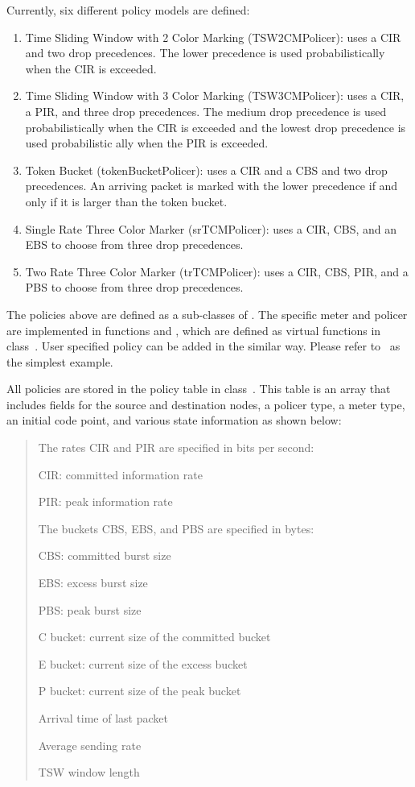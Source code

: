 Currently, six different policy models are defined:
\begin{enumerate}
\item
Time Sliding Window with 2 Color Marking (TSW2CMPolicer): 
  uses a CIR and two drop precedences.  
The lower precedence is used probabilistically when the CIR is exceeded.
\item
Time Sliding Window with 3 Color Marking (TSW3CMPolicer): 
  uses a CIR, a PIR, and three drop precedences.  
The medium drop precedence is used probabilistically 
  when the CIR is exceeded and the lowest drop precedence is used 
  probabilistic ally when the PIR is exceeded.
\item
Token Bucket (tokenBucketPolicer): 
  uses a CIR and a CBS and two drop precedences.  
An arriving packet is marked with the lower precedence if and 
  only if it is larger than the token bucket.
\item
Single Rate Three Color Marker (srTCMPolicer): 
  uses a CIR, CBS, and an EBS to choose from three drop precedences.
\item
Two Rate Three Color Marker (trTCMPolicer): 
  uses a CIR, CBS, PIR, and a PBS to choose from three drop precedences.
\end{enumerate}

The policies above are defined as a sub-classes of .
The specific meter and policer are implemented in functions 
   and ,
  which are defined as virtual functions in class~.
User specified policy can be added in the similar way.
Please refer to~ as the simplest example.

All policies are stored in the policy table in class~.
This table is an array that includes fields for 
  the source and destination nodes, 
  a policer type, a meter type, 
  an initial code point, and various state information as shown below:

\begin{quote}
The rates CIR and PIR are specified in bits per second:

CIR: committed information rate

PIR: peak information rate

The buckets CBS, EBS, and PBS are specified in bytes:

CBS: committed burst size

EBS: excess burst size

PBS: peak burst size

C bucket: current size of the committed bucket

E bucket: current size of the excess bucket

P bucket: current size of the peak bucket

Arrival time of last packet

Average sending rate

TSW window length

\end{quote}

